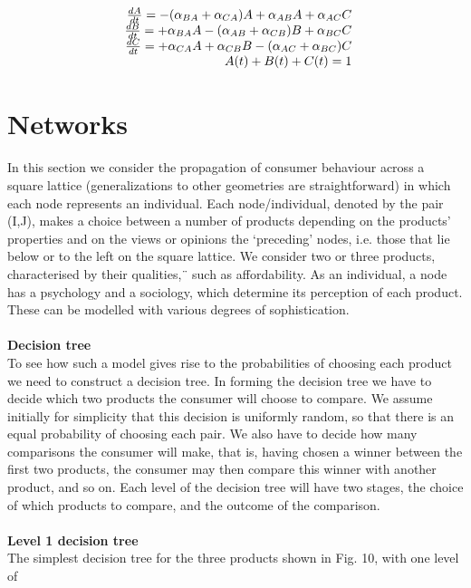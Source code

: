 \begin{equation} \label{eq:11}
\begin{array}{r@{}l}
\frac{dA}{dt} = -(\alpha_{BA}+ \alpha_{CA})A + \alpha_{AB}A + \alpha_{AC}C \\
\frac{dB}{dt} = +\alpha_{BA}A - (\alpha_{AB} + \alpha_{CB})B + \alpha_{BC}C \\
\frac{dC}{dt} = +\alpha_{CA}A + \alpha_{CB}B - (\alpha_{AC} + \alpha_{BC})C \\
A(t) + B(t) + C(t) = 1
\end{array}
\end{equation}

\section{Networks} \label{sec:networks}
In this section we consider the propagation of consumer behaviour across a square lattice
(generalizations to other geometries are straightforward) in which each node represents an individual.
Each node/individual, denoted by the pair (I,J), makes a choice between a number of products depending on
the products’ properties and on the views or opinions the ‘preceding’ nodes, i.e. those that lie below
or to the left on the square lattice. We consider two or three products, characterised by their qualities,¨
such as affordability. As an individual, a node has a psychology and a sociology, which determine its
perception of each product. These can be modelled with various degrees of sophistication.\\
\\
\textbf{Decision tree} \label{subsec:tree}\\
To see how such a model gives rise to the probabilities of choosing each product we need to
construct a decision tree. In forming the decision tree we have to decide which two  products the consumer
will choose to compare. We assume initially for simplicity that this decision is uniformly random, so that
there is an equal probability of choosing each pair. We also have to decide how many comparisons the consumer
will make, that is, having chosen a winner between the first two products, the consumer may then compare
this winner with another product, and so on. Each level of the decision tree will have two stages, the choice
of which products to compare, and the outcome of the comparison.\\
\\
\textbf{Level 1 decision tree}\\
The simplest decision tree for the three products shown in Fig. 10, with one level of
